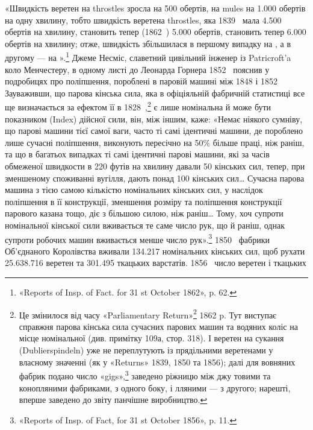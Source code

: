 «Швидкість веретен на throstles зросла на 500 обертів, на
mules на \num{1.000} обертів на одну хвилину, тобто швидкість веретена
throstles, яка 1839~ мала \num{4.500} обертів на хвилину, становить
тепер (1862~) \num{5.000} обертів, становить тепер \num{6.000} обертів на хвилину; отже,
швидкість збільшилася в першому випадку на , а в другому —
на ».\footnote{
«Reports of Insp. of Fact. for 31 st October 1862», p. 62.
} Джеме Несміс, славетний цивільний інженер із
Patricroft’a коло Менчестеру, в одному листі до Леонарда Горнера
1852~ пояснив у подробицях про поліпшення, пороблені в паровій
машині між 1848 і 1852~ Зауваживши, що парова кінська
сила, яка в офіціяльній фабричній статистиці все ще визначається
за ефектом її в 1828~,\footnote{
Це змінилося від часу «Parliamentary Return»\footnote*{
— парляментського звіту. \emph{Ред.}
} 1862 p. Тут виступає справжня парова кінська сила сучасних парових машин
та водяних коліс на місце номінальної (див. примітку 109а, стор. 318). І веретен
на сукання (Dublierspindeln) уже не переплутують із прядільними веретенами
у власному значенні (як у «Returns» 1839, 1850 та 1856); далі
для вовняних фабрик подано число «gigs»,\footnote*{
— ворсувальних машин. \emph{Ред.}
} заведено ріжницю між джу
товими та конопляними фабриками, з одного боку, і лляними — з другого;
нарешті, вперше заведено до звіту панчішне виробництво.
} є лише номінальна й може бути
показником (Index) дійсної сили, він, між іншим, каже:
«Немає ніякого сумніву, що парові машини тієї самої ваги, часто
ті самі ідентичні машини, де пороблено лише сучасні поліпшення,
виконують пересічно на 50\% більше праці, ніж раніш, та що в
багатьох випадках ті самі ідентичні парові машини, які за часів
обмеженої швидкости в 220 футів на хвилину давали 50 кінських
сил, тепер, при зменшеному споживанні вугілля, дають понад 100
кінських сил\dots{} Сучасна парова машина з тією самою кількістю
номінальних кінських сил, у наслідок поліпшення в її конструкції,
зменшення розміру та поліпшення конструкції парового
казана тощо, діє з більшою силою, ніж раніш\dots{} Тому, хоч супроти
номінальної кінської сили вживається те саме число рук, що й
раніш, однак супроти робочих машин вживається менше число
рук».\footnote{
«Reports of Insp. of Fact, for 31 st October 1856», p. 11.
} 1850~ фабрики Об’єднаного Королівства вживали \num{134.217}
номінальних кінських сил, щоб рухати \num{25.638.716} веретен та
\num{301.495} ткацьких варстатів. 1856~ число веретен і ткацьких
